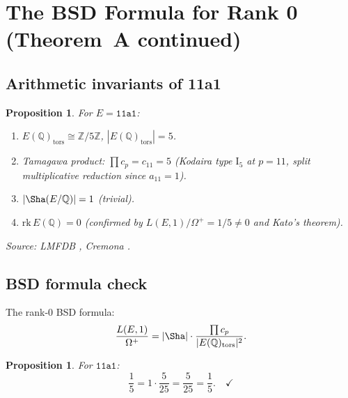 \documentclass[11pt]{article}
\theoremstyle{plain}
\newtheorem{proposition}[theorem]{Proposition}
\theoremstyle{definition}
\theoremstyle{remark}
\newcommand{\Z}{\mathbb{Z}}
\newcommand{\Q}{\mathbb{Q}}
\newcommand{\rk}{\mathrm{rk}}
\begin{document}
\section{The BSD Formula for Rank 0 (Theorem~A continued)}
\label{sec:bsd-rank0}

\subsection{Arithmetic invariants of 11a1}

\begin{proposition}\label{prop:bsd-data}
For $E = \texttt{11a1}$:
\begin{enumerate}[nosep,label=(\roman*)]
\item $E(\Q)_{\mathrm{tors}} \cong \Z/5\Z$, $|E(\Q)_{\mathrm{tors}}| = 5$.
\item Tamagawa product: $\prod c_p = c_{11} = 5$ (Kodaira type $\mathrm{I}_5$ at $p = 11$, split multiplicative reduction since $a_{11} = 1$).
\item $|\Sha(E/\Q)| = 1$ (trivial).
\item $\rk\, E(\Q) = 0$ (confirmed by $L(E,1)/\Omega^+ = 1/5 \neq 0$ and Kato's theorem).
\end{enumerate}
Source: LMFDB \cite{lmfdb}, Cremona \cite{cremona}.
\end{proposition}

\subsection{BSD formula check}

The rank-0 BSD formula:
\begin{equation}\label{eq:bsd0}
\frac{L(E,1)}{\Omega^+} = |\Sha| \cdot \frac{\prod c_p}{|E(\Q)_{\mathrm{tors}}|^2}.
\end{equation}

\begin{proposition}\label{prop:bsd-check}
For $\texttt{11a1}$:
\[
\frac{1}{5} = 1 \cdot \frac{5}{25} = \frac{5}{25} = \frac{1}{5}. \quad \checkmark
\]
\end{proposition}
\end{document}
